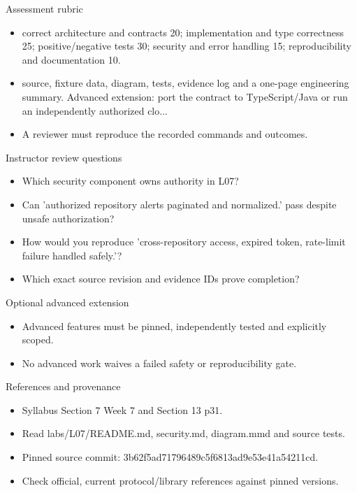 \documentclass[aspectratio=169,10pt]{beamer}
\begin{document}
\begin{frame}{Assessment rubric}
\small
\begin{itemize}
\item correct architecture and contracts 20; implementation and type correctness 25; positive/negative tests 30; security and error handling 15; reproducibility and documentation 10.
\item source, fixture data, diagram, tests, evidence log and a one-page engineering summary. Advanced extension: port the contract to TypeScript/Java or run an independently authorized clo...
\item A reviewer must reproduce the recorded commands and outcomes.
\end{itemize}

\end{frame}

\begin{frame}{Instructor review questions}
\small
\begin{itemize}
\item Which security component owns authority in L07?
\item Can 'authorized repository alerts paginated and normalized.' pass despite unsafe authorization?
\item How would you reproduce 'cross-repository access, expired token, rate-limit failure handled safely.'?
\item Which exact source revision and evidence IDs prove completion?
\end{itemize}

\end{frame}

\begin{frame}{Optional advanced extension}
\small
\begin{itemize}
\item Advanced features must be pinned, independently tested and explicitly scoped.
\item No advanced work waives a failed safety or reproducibility gate.
\end{itemize}

\end{frame}

\begin{frame}{References and provenance}
\small
\begin{itemize}
\item Syllabus Section 7 Week 7 and Section 13 p31.
\item Read labs/L07/README.md, security.md, diagram.mmd and source tests.
\item Pinned source commit: 3b62f5ad71796489c5f6813ad9e53e41a54211cd.
\item Check official, current protocol/library references against pinned versions.
\end{itemize}

\end{frame}
\end{document}
